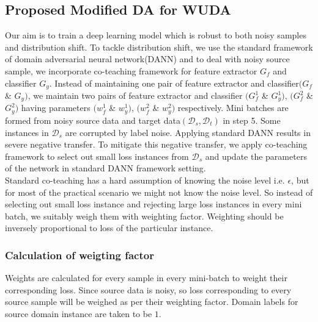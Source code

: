 

\subsection{Proposed Modified DA for WUDA}
Our aim is to train a deep learning model which is robust to both noisy samples and distribution shift. To tackle distribution shift, we use the standard framework of domain adversarial neural network(DANN) and to deal with noisy source sample, we incorporate co-teaching framework for feature extractor $G_f$ and classifier $G_y$. 
Instead of maintaining one pair of feature extractor and classifier$(G_f$ \& $G_y)$, we maintain two pairs of feature extractor and classifier $(G_{f}^1$ \& $G_{y}^1)$, $(G_{f}^2$ \& $G_{y}^2)$ having parameters $(w_{f}^1$ \& $w_{y}^1)$, $(w_{f}^2$ \& $w_{y}^2)$ respectively. Mini batches are formed from noisy source data and target data$(\mathcal{D}_s, \mathcal{D}_t)$ in step 5. Some instances in $\mathcal{D}_s$ are corrupted by label noise. Applying standard DANN results in severe negative transfer. To mitigate this negative transfer, we apply co-teaching framework to select out small loss instances from $\mathcal{D}_s$ and update the parameters of the network in standard DANN framework setting.\\
Standard co-teaching has a hard assumption of knowing the noise level i.e. $\epsilon$, but for most of the practical scenario we might not know the noise level. So instead of selecting out small loss instance and rejecting large loss instances in every mini batch, we suitably weigh them with weighting factor. Weighting should be inversely proportional to loss of the particular instance.
\subsubsection{Calculation of weigting factor}
Weights are calculated for every sample in every mini-batch to weight their corresponding loss. Since source data is noisy, so loss corresponding to every source sample will be weighed as per their weighting factor. Domain labels for source domain instance are taken to be $1$.

